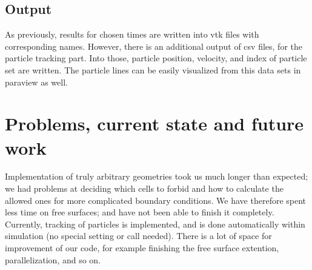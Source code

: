 \documentclass[a4paper, 12pt]{article}
\begin{document}
\subsection{Output}
As previously, results for chosen times are written into vtk files with corresponding names. However, there is an additional output of csv files, for the 
particle tracking part. Into those, particle position, velocity, and index of particle set are written.
The particle lines can be easily visualized from this data sets in paraview as well. 
 
\section{Problems, current state and future work}\label{sec:prob_state_future}
Implementation of truly arbitrary geometries took us much longer than expected; we had problems at deciding which cells to forbid and how to calculate the 
allowed ones for more complicated boundary conditions. We have therefore spent less time on free surfaces; and have not been able to finish it completely.
Currently, tracking of particles is implemented, and is done automatically within simulation (no special setting or call needed).
There is a lot of space for improvement of our code, for example finishing the free surface extention, parallelization, and so on. 
\end{document}

